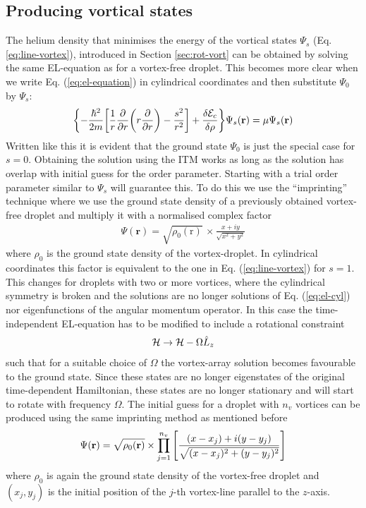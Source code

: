 \documentclass[12pt,a4paper]{book}
\renewcommand{\vec}[1]{\bm{\mathrm{#1}}}
\begin{document}
			\subsection{Producing vortical states}	
				The helium density that minimises the energy of the vortical states $\Psi_s$ (Eq. \ref{eq:line-vortex}), introduced in Section \ref{sec:rot-vort} can be obtained by solving the same EL-equation as for a vortex-free droplet. This becomes more clear when we write Eq. (\ref{eq:el-equation}) in cylindrical coordinates and then substitute $\Psi_0$ by $\Psi_s$:
				\begin{align}
					\qty{-\frac{\hbar^2}{2m}\qty[\frac{1}{r}\pdv{r}\qty(r\pdv{r})-\frac{s^2}{r^2}]+\fdv{\mathcal{E}_c}{\rho}}\Psi_s(\vec{r}) = \mu\Psi_s(\vec{r}) \label{eq:el-cyl}
				\end{align}
				Written like this it is evident that the ground state $\Psi_0$ is just the special case for $s=0$. Obtaining the solution using the ITM works as long as the solution has overlap with initial guess for the order parameter. Starting with a trial order parameter similar to $\Psi_s$ will guarantee this. To do this we use the ``imprinting'' technique where we use the ground state density of a previously obtained vortex-free droplet and multiply it with a normalised complex factor
				\begin{align}
					\Psi(\mathbf{r}) = \sqrt{\rho_0(\vec{r})} \,\times \frac{x + iy}{\sqrt{x^2 + y^2}} \label{eq28}
				\end{align}
				where $\rho_0$ is the ground state density of the vortex-droplet.  In cylindrical coordinates this factor is equivalent to the one in Eq. (\ref{eq:line-vortex}) for $s=1$.\\ 
				
				This changes for droplets with two or more vortices, where the cylindrical symmetry is broken and the solutions are no longer solutions of Eq. (\ref{eq:el-cyl}) nor eigenfunctions of the angular momentum operator. In this case the time-independent EL-equation has to be modified to include a rotational constraint
				\begin{align}
					{\cal H} \rightarrow {\cal H}-\Omega \hat{L}_z
				\end{align}
				 such that for a suitable choice of $\Omega$ the vortex-array solution becomes favourable to the ground state. Since these states are no longer eigenstates of the original time-dependent Hamiltonian, these states are no longer stationary and will start to rotate with frequency $\Omega$. The initial guess for a droplet with $n_v$ vortices can be produced using the same imprinting method as mentioned before		
				\begin{align}
					\Psi(\mathbf{r})=\sqrt{\rho_0(\vec{r})} \times \prod _{j=1}^{n_v}\left[ {(x-x_j)+i(y-y_j) \over \sqrt{(x-x_j)^2+(y-y_j)^2}}  \right] \label{eq32}
				\end{align}
				where $\rho_0$ is again the ground state density of the vortex-free droplet and $(x_j,y_j)$ is the initial position of the $j$-th vortex-line parallel to the $z$-axis.
				
\end{document}
